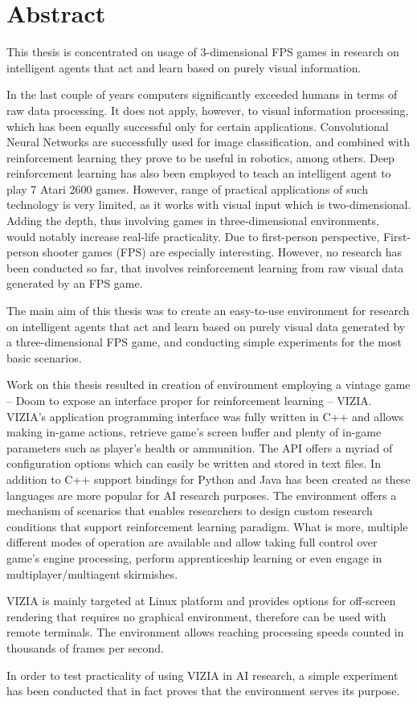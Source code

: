 \chapter*{Abstract}

This thesis is concentrated on usage of 3-dimensional FPS games in research on intelligent agents that act and learn based on purely visual information.


In the last couple of years computers significantly exceeded humans in terms of raw data processing.
It does not apply, however, to visual information processing, which has been equally successful only for certain applications.
Convolutional Neural Networks are successfully used for image classification, and combined with reinforcement learning they prove to be useful in robotics, among others.
Deep reinforcement learning has also been employed to teach an intelligent agent to play 7 Atari 2600 games.
However, range of practical applications of such technology is very limited, as it works with visual input which is two-dimensional.
Adding the depth, thus involving games in three-dimensional environments, would notably increase real-life practicality.
Due to first-person perspective, First-person shooter games (FPS) are especially interesting. However, no research has been conducted so far, that involves reinforcement learning from raw visual data generated by an FPS game.

The main aim of this thesis was to create an easy-to-use environment for research on intelligent agents that act and learn based on purely visual data generated by a three-dimensional FPS game, and conducting simple experiments for the most basic scenarios.


Work on this thesis resulted in creation of environment employing a vintage game -- Doom to expose an interface proper for reinforcement learning -- VIZIA. VIZIA's application programming interface was fully written in C++ and allows making in-game actions, retrieve game's screen buffer and plenty of in-game parameters such as player's health or ammunition. 
The API offers a myriad of configuration options which can easily be written and stored in text files.
In addition to C++ support bindings for Python and Java has been created as these languages are more popular for AI research purposes. 
The environment offers a mechanism of scenarios that enables researchers to design custom research conditions that support reinforcement learning paradigm.
What is more, multiple different modes of operation are available and allow taking full control over game's engine processing, perform apprenticeship learning or even engage in multiplayer/multiagent skirmishes. 

VIZIA is mainly targeted at Linux platform and provides options for off-screen rendering that requires no graphical environment, therefore can be used with remote terminals.
The environment allows reaching processing speeds counted in thousands of frames per second.

In order to test practicality of using VIZIA in AI research, a simple experiment has been conducted that in fact proves that the environment serves its purpose.
